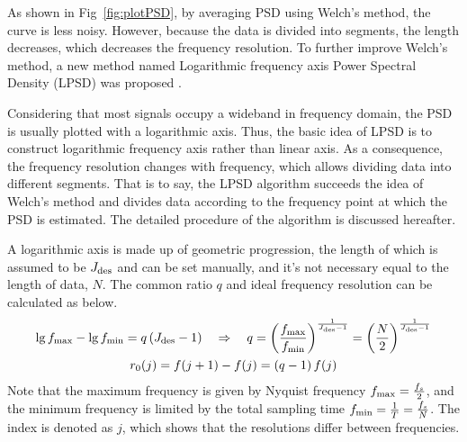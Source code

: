 As shown in Fig~\ref{fig:plotPSD}, by averaging PSD using Welch's method, the curve is less noisy. However, because the data is divided into segments, the length decreases, which decreases the frequency resolution. To further improve Welch's method, a new method named Logarithmic frequency axis Power Spectral Density (LPSD) was proposed \cite{trobsImprovedSpectrumEstimation2006}.


Considering that most signals occupy a wideband in frequency domain, the PSD is usually plotted with a logarithmic axis. Thus, the basic idea of LPSD is to construct logarithmic frequency axis rather than linear axis. As a consequence, the frequency resolution changes with frequency, which allows dividing data into different segments. That is to say, the LPSD algorithm succeeds the idea of Welch's method and divides data according to the frequency point at which the PSD is estimated. The detailed procedure of the algorithm is discussed hereafter.


A logarithmic axis is made up of geometric progression, the length of which is assumed to be $J_{\rm des}$ and can be set manually, and it's not necessary equal to the length of data, $N$. The common ratio $q$ and ideal frequency resolution can be calculated as below.
\begin{gather}
    \lg f_{\rm max} - \lg f_{\rm min} = q\left(J_{\rm des} -1 \right) \quad \Rightarrow \quad q = \left(\frac{f_{\rm max}}{f_{\rm min}}\right)^{\frac{1}{J_{\rm des} -1}} = \left(\frac{N}{2}\right)^{\frac{1}{J_{\rm des} -1}} \\
    r_0(j) = f(j+1) - f(j) = \left(q-1\right) f(j)
    \label{eq:r0}
\end{gather}
Note that the maximum frequency is given by Nyquist frequency $f_{\rm max} = \frac{f_s}{2}$, and the minimum frequency is limited by the total sampling time $f_{\rm min} = \frac{1}{T} = \frac{f_s}{N}$. The index is denoted as $j$, which shows that the resolutions differ between frequencies.


